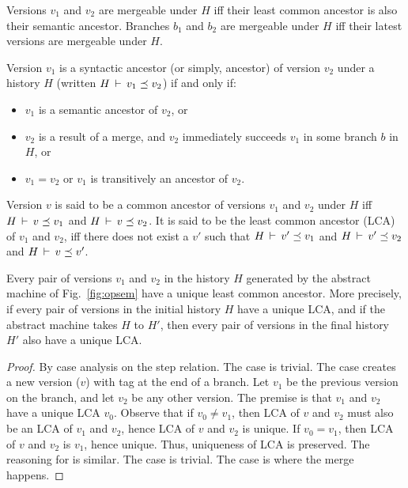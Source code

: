 \begin{definition} 
Versions $v_1$ and $v_2$ are mergeable under $H$ iff their least
common ancestor is also their semantic ancestor. Branches $b_1$ and
$b_2$ are mergeable under $H$ iff their latest versions are mergeable
under $H$.
\end{definition}

\begin{definition} 
Version $v_1$ is a syntactic ancestor (or simply, ancestor) of
version $v_2$ under a history $H$ (written $H\,\vdash\,v_1 \preceq
v_2$) if and only if:
\begin{itemize}
  \item $v_1$ is a semantic ancestor of $v_2$, or
  \item $v_2$ is a result of a merge, and $v_2$ immediately succeeds
  $v_1$ in some branch $b$ in $H$, or
  \item $v_1 = v_2$ or $v_1$ is transitively an ancestor of $v_2$.
\end{itemize}
\end{definition}

\begin{definition} 
Version $v$ is said to be a common ancestor of versions $v_1$ and
$v_2$ under $H$ iff $H\,\vdash\,v \preceq v_1$ and $H\,\vdash\,v
\preceq v_2$. It is said to be the least common ancestor (LCA) of
$v_1$ and $v_2$, iff there does not exist a $v'$ such that
$H\,\vdash\,v' \preceq v_1$ and $H\,\vdash\,v' \preceq v_2$ and
$H\,\vdash\,v \preceq v'$.
\end{definition}



\begin{theorem} 
Every pair of versions $v_1$ and $v_2$ in the history $H$ generated by
the abstract machine of Fig.~\ref{fig:opsem} have a unique least
common ancestor. More precisely, if every pair of versions in the
initial history $H$ have a unique LCA, and if the abstract machine
takes $H$ to $H'$, then every pair of versions in the final history
$H'$ also have a unique LCA.
\end{theorem}
\begin{proof}
By case analysis on the step relation. The  case is
trivial. The  case creates a new version ($v$) with
 tag at the end of a branch. Let $v_1$ be the previous version
on the branch, and let $v_2$ be any other version. The premise is that
$v_1$ and $v_2$ have a unique LCA $v_0$. Observe that if $v_0 \neq
v_1$, then LCA of $v$ and $v_2$ must also be an LCA of $v_1$ and
$v_2$, hence LCA of $v$ and $v_2$ is unique. If $v_0 = v_1$, then LCA
of $v$ and $v_2$ is $v_1$, hence unique. Thus, uniqueness of LCA is
preserved. The reasoning for  is similar. The 
 case is trivial. The  case
is where the merge happens. 
\end{proof}
